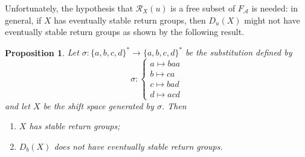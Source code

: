 \documentclass{amsart}
\newcommand*{\ret}{\mathcal{R}}
\newcommand*{\cA}{\mathcal{A}}
\newcommand*{\from}{\colon}
\newcommand{\displaysub}[1]{\begin{cases}#1\end{cases}}
\theoremstyle{plain}
\newtheorem{proposition}[theorem]{Proposition}
\theoremstyle{definition}
\theoremstyle{remark}
\begin{document}
Unfortunately, the hypothesis that $\ret_X(u)$ is a free subset of $F_\cA$ is needed: in general, if $X$ has eventually stable return groups, then $D_u(X)$ might not have eventually stable return groups as shown by the following result.

\begin{proposition}\label{p:contre-exemple}
    Let $\sigma\from \{a,b,c,d\}^* \to \{a,b,c,d\}^*$ be the substitution defined by
    \begin{equation*}
        \sigma\from \displaysub{ a\mapsto baa \\ b\mapsto ca \\ c\mapsto bad \\ d\mapsto acd }
    \end{equation*}
    and let $X$ be the shift space generated by $\sigma$. Then
    \begin{enumerate}
        \item $X$ has stable return groups;
            \label{i:contre-exemple-stable}
        \item $D_b(X)$ does not have eventually stable return groups.
            \label{i:contre-exemple-instable}
    \end{enumerate}
\end{proposition}
\end{document}
